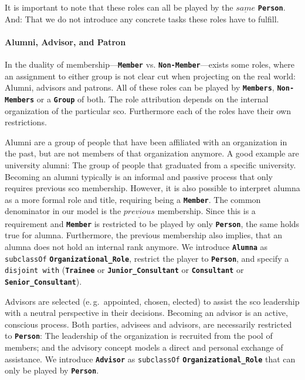 \documentclass[a4paper, DIV=13, BCOR=0cm]{scrbook}
\newcommand{\eg}{e.\,g.\ }
\newcommand{\class}[1]{\texttt{\textbf{#1}}}
\newcommand{\relation}[1]{\texttt{#1}}
\begin{document}
It is important to note that these roles can all be played by the $\underline{same}$ \class{Person}. And: That we do not introduce any concrete tasks these roles have to fulfill.

\paragraph{Alumni, Advisor, and Patron}
In the duality of membership---\class{Member} vs. \class{Non-Member}---exists some roles, where an assignment to either group is not clear cut when projecting on the real world: Alumni, advisors and patrons. All of these roles can be played by \class{Members}, \class{Non-Members} or a \class{Group} of both. The role attribution depends on the internal organization of the particular \gls{sco}. Furthermore each of the roles have their own restrictions.

Alumni are a group of people that have been affiliated with an organization in the past, but are not members of that organization anymore. A good example are university alumni: The group of people that graduated from a specific university. Becoming an alumni typically is an informal and passive process that only requires previous \gls{sco} membership. However, it is also possible to interpret alumna as a more formal role and title, requiring being a \class{Member}. The common denominator in our model is the $\underline{previous}$ membership. Since this is a requirement and \class{Member} is restricted to be played by only \class{Person}, the same holds true for alumna. Furthermore, the previous membership also implies, that an alumna does not hold an internal rank anymore. We introduce \class{Alumna} as \relation{subclassOf} \class{Organizational\_Role}, restrict the player to \class{Person}, and specify a \relation{disjoint with} (\class{Trainee} or \class{Junior\_Consultant} or \class{Consultant} or \class{Senior\_Consultant}).

Advisors are selected (\eg appointed, chosen, elected) to assist the \gls{sco} leadership with a neutral perspective in their decisions. Becoming an advisor is an active, conscious process. Both parties, advisees and advisors, are necessarily restricted to \class{Person}: The leadership of the organization is recruited from the pool of members; and the advisory concept models a direct and personal exchange of assistance. We introduce \class{Advisor} as \relation{subclassOf} \class{Organizational\_Role} that can only be played by \class{Person}.
\end{document}

